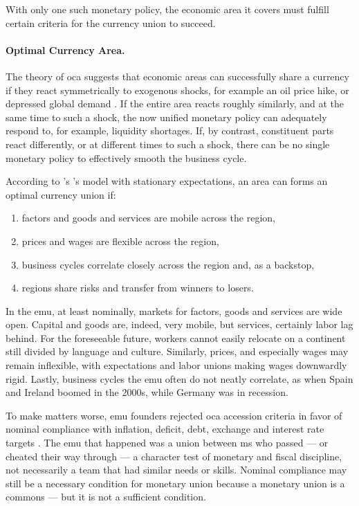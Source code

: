 With only one such monetary policy, the economic area it covers must fulfill certain criteria for the currency union to succeed.

\paragraph{Optimal Currency Area.}
	\label{sec:OCA}
The theory of \gls{oca} suggests that economic areas can successfully share a currency if they react symmetrically to exogenous shocks, for example an oil price hike, or depressed global demand \citep{Mundell1961}.
If the entire area reacts roughly similarly, and at the same time to such a shock, the now unified monetary policy can adequately respond to, for example, liquidity shortages.
If, by contrast, constituent parts react differently, or at different times to such a shock, there can be no single monetary policy to effectively smooth the business cycle.

According to \citeauthor{Mundell1961}'s \citeyearpar{Mundell1961}'s  model with stationary expectations, an area can forms an optimal currency union if:
\begin{enumerate}
	\item factors and goods and services are mobile across the region,
	\item prices and wages are flexible across the region,
	\item business cycles correlate closely across the region and, as a backstop,
	\item regions share risks and transfer from winners to losers.
\end{enumerate}

In the \gls{emu}, at least nominally, markets for factors, goods and services are wide open.
Capital and goods are, indeed, very mobile, but services, certainly labor lag behind.
For the foreseeable future, workers cannot easily relocate on a continent still divided by language and culture.
Similarly, prices, and especially wages may remain inflexible, with expectations and labor unions making wages downwardly rigid.
Lastly, business cycles the \gls{emu} often do not neatly correlate, as when Spain and Ireland boomed in the 2000s, while Germany was in recession.

To make matters worse, \gls{emu} founders rejected \gls{oca} accession criteria in favor of nominal compliance with inflation, deficit, debt, exchange and interest rate targets \citep[4]{Begg2008}.
The \gls{emu} that happened was a union between \gls{ms} who passed --- or cheated their way through --- a character test of monetary and fiscal discipline, not necessarily a team that had similar needs or skills.
Nominal compliance may still be a necessary condition for monetary union because a monetary union is a commons --- but it is not a sufficient condition.

